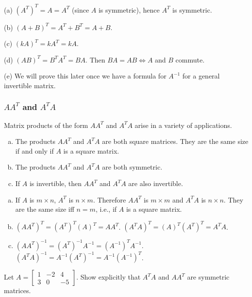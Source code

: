 \documentclass[12pt,letterpaper,reqno]{article}
\numberwithin{equation}{section}
\newcommand{\fixme}[1]{{\color{orange}{[#1]}}}
\begin{document}
\begin{pf}
(a) $(A^T)^T=A=A^T$ (since $A$ is symmetric), hence $A^T$ is symmetric. 

(b) $(A+B)^T=A^T+B^T=A+B$.

(c) $(kA)^T=kA^T=kA$. 

(d) $(AB)^T=B^TA^T=BA$. Then $BA=AB \iff A$ and $B$ commute. 

(e) We will prove this later once we have a formula for $A^{-1}$ for a general invertible matrix.	\fixme{Introduce Cramer's rule before this?}
\end{pf}

\subsubsection{$AA^T$ and $A^TA$}
Matrix products of the form $AA^T$ and $A^TA$ arise in a variety of applications. 

\begin{thm}\label{thm:props_of_aat_and_ata}
	\begin{enumerate}[(a)]
		\item The products $AA^T$ and $A^TA$ are both square matrices. They are the same size if and only if $A$ is a square matrix.
		\item The products $AA^T$ and $A^TA$ are both symmetric.
		\item If $A$ is invertible, then $AA^T$ and $A^TA$ are also invertible.
	\end{enumerate}
\end{thm}

\begin{pf}
	\begin{enumerate}[(a)]
		\item If $A$ is $m\times n$, $A^T$ is $n \times m$. Therefore $AA^T$ is $m \times m$ and $A^TA$ is $n \times n$. They are the same size iff $n=m$, i.e., if $A$ is a square matrix.
		\item $(AA^T)^T=(A^T)^T(A)^T=AA^T$. $(A^TA)^T=(A)^T(A^T)^T=A^TA$.
		\item $(AA^T)^{-1}=(A^T)^{-1}A^{-1}=(A^{-1})^TA^{-1}$. $(A^TA)^{-1}=A^{-1}(A^T)^{-1}=A^{-1}(A^{-1})^T$.
	\end{enumerate}
\end{pf}

\begin{exercise}
	Let $A=\begin{bmatrix}
		1 & -2 & 4 \\ 3 & 0 & -5
	\end{bmatrix}$. Show explicitly that $A^TA$ and $AA^T$ are symmetric matrices.	
\end{exercise}
\end{document}
